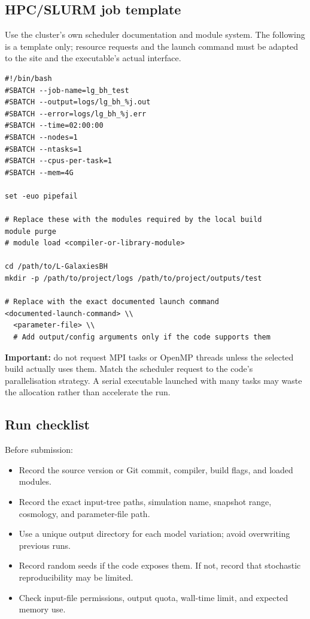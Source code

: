 \documentclass[11pt,a4paper]{article}
\begin{document}
\subsection{HPC/SLURM job template}

Use the cluster's own scheduler documentation and module system. The following is a template only; resource requests and the launch command must be adapted to the site and the executable's actual interface.

\begin{lstlisting}
#!/bin/bash
#SBATCH --job-name=lg_bh_test
#SBATCH --output=logs/lg_bh_%j.out
#SBATCH --error=logs/lg_bh_%j.err
#SBATCH --time=02:00:00
#SBATCH --nodes=1
#SBATCH --ntasks=1
#SBATCH --cpus-per-task=1
#SBATCH --mem=4G

set -euo pipefail

# Replace these with the modules required by the local build
module purge
# module load <compiler-or-library-module>

cd /path/to/L-GalaxiesBH
mkdir -p /path/to/project/logs /path/to/project/outputs/test

# Replace with the exact documented launch command
<documented-launch-command> \\
  <parameter-file> \\
  # Add output/config arguments only if the code supports them
\end{lstlisting}

\textbf{Important:} do not request MPI tasks or OpenMP threads unless the selected build actually uses them. Match the scheduler request to the code's parallelisation strategy. A serial executable launched with many tasks may waste the allocation rather than accelerate the run.

\subsection{Run checklist}

Before submission:
\begin{itemize}
  \item Record the source version or Git commit, compiler, build flags, and loaded modules.
  \item Record the exact input-tree paths, simulation name, snapshot range, cosmology, and parameter-file path.
  \item Use a unique output directory for each model variation; avoid overwriting previous runs.
  \item Record random seeds if the code exposes them. If not, record that stochastic reproducibility may be limited.
  \item Check input-file permissions, output quota, wall-time limit, and expected memory use.
\end{itemize}
\end{document}
